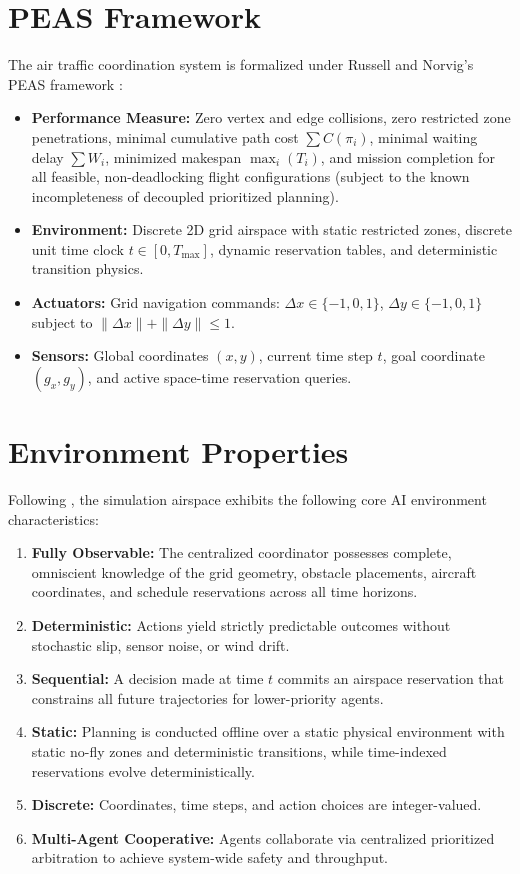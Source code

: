 \documentclass[11pt,a4paper]{article}
\begin{document}
\section{PEAS Framework}
The air traffic coordination system is formalized under Russell and Norvig's PEAS framework \cite{russell2020}:
\begin{itemize}
    \item \textbf{Performance Measure:} Zero vertex and edge collisions, zero restricted zone penetrations, minimal cumulative path cost $\sum C(\pi_i)$, minimal waiting delay $\sum W_i$, minimized makespan $\max_i(T_i)$, and mission completion for all feasible, non-deadlocking flight configurations (subject to the known incompleteness of decoupled prioritized planning).
    \item \textbf{Environment:} Discrete 2D grid airspace with static restricted zones, discrete unit time clock $t \in [0, T_{\max}]$, dynamic reservation tables, and deterministic transition physics.
    \item \textbf{Actuators:} Grid navigation commands: $\Delta x \in \{-1, 0, 1\}$, $\Delta y \in \{-1, 0, 1\}$ subject to $\|\Delta x\| + \|\Delta y\| \le 1$.
    \item \textbf{Sensors:} Global coordinates $(x, y)$, current time step $t$, goal coordinate $(g_x, g_y)$, and active space-time reservation queries.
\end{itemize}

\section{Environment Properties}
Following \cite{russell2020}, the simulation airspace exhibits the following core AI environment characteristics:
\begin{enumerate}
    \item \textbf{Fully Observable:} The centralized coordinator possesses complete, omniscient knowledge of the grid geometry, obstacle placements, aircraft coordinates, and schedule reservations across all time horizons.
    \item \textbf{Deterministic:} Actions yield strictly predictable outcomes without stochastic slip, sensor noise, or wind drift.
    \item \textbf{Sequential:} A decision made at time $t$ commits an airspace reservation that constrains all future trajectories for lower-priority agents.
    \item \textbf{Static:} Planning is conducted offline over a static physical environment with static no-fly zones and deterministic transitions, while time-indexed reservations evolve deterministically.
    \item \textbf{Discrete:} Coordinates, time steps, and action choices are integer-valued.
    \item \textbf{Multi-Agent Cooperative:} Agents collaborate via centralized prioritized arbitration to achieve system-wide safety and throughput.
\end{enumerate}
\end{document}
